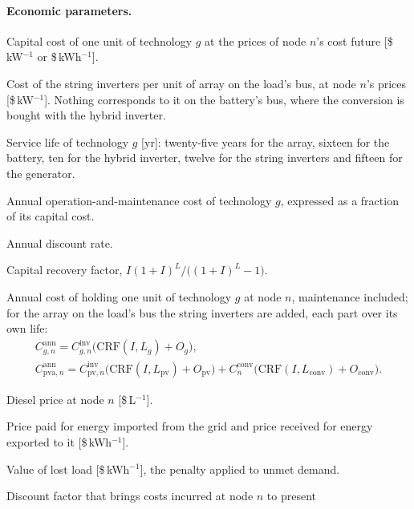 \documentclass[11pt,a4paper]{article}
\theoremstyle{plain}
\theoremstyle{definition}
\newcommand{\CRF}{\mathrm{CRF}}
\begin{document}
\paragraph{Economic parameters.}
\begin{description}[leftmargin=3.0cm,style=nextline]
  \item[$C^{\mathrm{inv}}_{g,n}$] Capital cost of one unit of technology $g$ at the prices
  of node $n$'s cost future [\$\,kW$^{-1}$ or \$\,kWh$^{-1}$].
  \item[$C^{\mathrm{conv}}_n$] Cost of the string inverters per unit of array on the load's
  bus, at node $n$'s prices [\$\,kW$^{-1}$]. Nothing corresponds to it on the battery's
  bus, where the conversion is bought with the hybrid inverter.
  \item[$L_g$] Service life of technology $g$ [yr]: twenty-five years for the array,
  sixteen for the battery, ten for the hybrid inverter, twelve for the string inverters
  and fifteen for the generator.
  \item[$O_{g}$] Annual operation-and-maintenance cost of technology $g$, expressed as a
  fraction of its capital cost.
  \item[$I$] Annual discount rate.
  \item[$\CRF(I,L)$] Capital recovery factor, $I(1+I)^{L}/\big((1+I)^{L}-1\big)$.
  \item[$C^{\mathrm{ann}}_{g,n}$] Annual cost of holding one unit of technology $g$ at
  node $n$, maintenance included; for the array on the load's bus the string inverters are
  added, each part over its own life:
  \begin{gather*}
    C^{\mathrm{ann}}_{g,n}=C^{\mathrm{inv}}_{g,n}\big(\CRF(I,L_g)+O_g\big),\\
    C^{\mathrm{ann}}_{\mathrm{pva},n}
    = C^{\mathrm{inv}}_{\mathrm{pv},n}\big(\CRF(I,L_{\mathrm{pv}})+O_{\mathrm{pv}}\big)
    + C^{\mathrm{conv}}_n\big(\CRF(I,L_{\mathrm{conv}})+O_{\mathrm{conv}}\big).
  \end{gather*}
  \item[$C^{\mathrm{fuel}}_n$] Diesel price at node $n$ [\$\,L$^{-1}$].
  \item[$C^{\mathrm{imp}},\ C^{\mathrm{exp}}$] Price paid for energy imported from the grid
  and price received for energy exported to it [\$\,kWh$^{-1}$].
  \item[$V^{\mathrm{lol}}$] Value of lost load [\$\,kWh$^{-1}$], the penalty applied to
  unmet demand.
  \item[$B_n$] Discount factor that brings costs incurred at node $n$ to present

\end{description}
\end{document}
